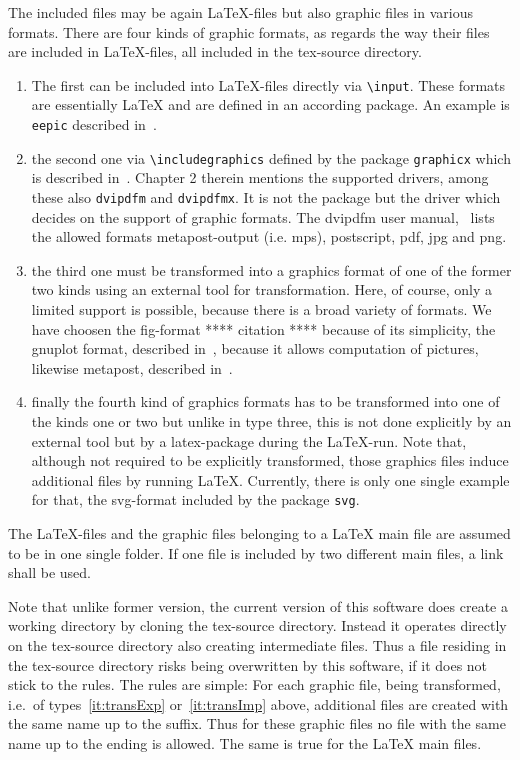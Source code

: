 \documentclass[12pt]{book}
\begin{document}
The included files may be again \LaTeX-files but also graphic files 
in various formats. 
There are four kinds of graphic formats, 
as regards the way their files are included in \LaTeX-files, 
all included in the tex-source directory. 
%
\begin{enumerate}
\item
The first can be included into \LaTeX-files directly 
via {\tt\textbackslash input}. 
These formats are essentially \LaTeX{} and are defined in an according package. 
An example is {\tt eepic} described in~\cite{EEpic}. 
\item
the second one via {\tt\textbackslash includegraphics} 
defined by the package {\tt graphicx} 
which is described in~\cite{GraX}. 
Chapter 2 therein mentions the supported drivers, 
among these also {\tt dvipdfm} and {\tt dvipdfmx}. 
It is not the package but the driver 
which decides on the support of graphic formats. 
The dvipdfm user manual,~\cite{DviPdfMx} lists the allowed formats 
metapost-output (i.e. \gls{mps}), postscript, 
\gls{pdf}, \gls{jpg} and \gls{png}. 
\item\label{it:transExp}
the third one must be transformed into a graphics format 
of one of the former two kinds using an external tool for transformation. 
Here, of course, only a limited support is possible, 
because there is a broad variety of formats. 
We have choosen the \gls{fig}-format **** citation **** because of its simplicity, 
the gnuplot format, described in~\cite{GnuPlot}, 
because it allows computation of pictures, 
likewise metapost, described in~\cite{MPost}. 
\item\label{it:transImp}
finally the fourth kind of graphics formats 
has to be transformed into one of the kinds one or two 
but unlike in type three, this is not done explicitly 
by an external tool but by a latex-package during the \LaTeX-run. 
Note that, although not required to be explicitly transformed, 
those graphics files induce additional files 
by running \LaTeX. 
Currently, there is only one single example for that, 
the \gls{svg}-format included by the package {\tt svg}. 
\end{enumerate}

The \LaTeX-files and the graphic files belonging to a \LaTeX{} main file 
are assumed to be in one single folder. 
If one file is included by two different main files, 
a link shall be used. 

Note that unlike former version, 
the current version of this software does create a working directory 
by cloning the tex-source directory. 
Instead it operates directly on the tex-source directory 
also creating intermediate files. 
Thus a file residing in the tex-source directory 
risks being overwritten by this software, 
if it does not stick to the rules. 
The rules are simple: 
For each graphic file, being transformed, 
i.e.~of types~\ref{it:transExp} or~\ref{it:transImp} above, 
additional files are created with the same name up to the suffix. 
Thus for these graphic files no file with the same name 
up to the ending is allowed. 
The same is true for the \LaTeX{} main files. 
\end{document}
